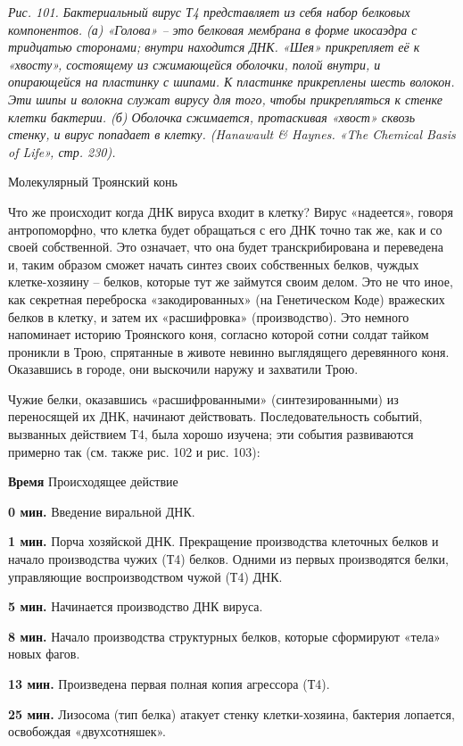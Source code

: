 \documentclass[../main.tex]{subfiles}
\begin{document}
\emph{Рис. 101. Бактериальный вирус Т4 представляет из себя набор белковых компонентов. (а) «Голова» \--- это белковая мембрана в форме икосаэдра с тридцатью сторонами; внутри находится ДНК\@. «Шея» прикрепляет её к «хвосту», состоящему из сжимающейся оболочки, полой внутри, и опирающейся на пластинку с шипами. К пластинке прикреплены шесть волокон. Эти шипы и волокна служат вирусу для того, чтобы прикрепляться к стенке клетки бактерии. (б) Оболочка сжимается, протаскивая «хвост» сквозь стенку, и вирус попадает в клетку. (Hanawault \& Haynes. «The Chemical Basis of Life», стр. 230).}

Молекулярный Троянский конь

Что же происходит когда ДНК вируса входит в клетку? Вирус «надеется», говоря антропоморфно, что клетка будет обращаться с его ДНК точно так же, как и со своей собственной. Это означает, что она будет транскрибирована и переведена и, таким образом сможет начать синтез своих собственных белков, чуждых клетке-хозяину \--- белков, которые тут же займутся своим делом. Это не что иное, как секретная переброска «закодированных» (на Генетическом Коде) вражеских белков в клетку, и затем их «расшифровка» (производство). Это немного напоминает историю Троянского коня, согласно которой сотни солдат тайком проникли в Трою, спрятанные в животе невинно выглядящего деревянного коня. Оказавшись в городе, они выскочили наружу и захватили Трою.

Чужие белки, оказавшись «расшифрованными» (синтезированными) из переносящей их ДНК, начинают действовать. Последовательность событий, вызванных действием Т4, была хорошо изучена; эти события развиваются примерно так (см. также рис. 102 и рис. 103):

\textbf{Время} Происходящее действие

\textbf{0 мин.} Введение виральной ДНК.

\textbf{1 мин.} Порча хозяйской ДНК\@. Прекращение производства клеточных белков и начало производства чужих (Т4) белков. Одними из первых производятся белки, управляющие воспроизводством чужой (Т4) ДНК.

\textbf{5 мин.} Начинается производство ДНК вируса.

\textbf{8 мин.} Начало производства структурных белков, которые сформируют «тела» новых фагов.

\textbf{13 мин.} Произведена первая полная копия агрессора (Т4).

\textbf{25 мин.} Лизосома (тип белка) атакует стенку клетки-хозяина, бактерия лопается, освобождая «двухсотняшек».
\end{document}
